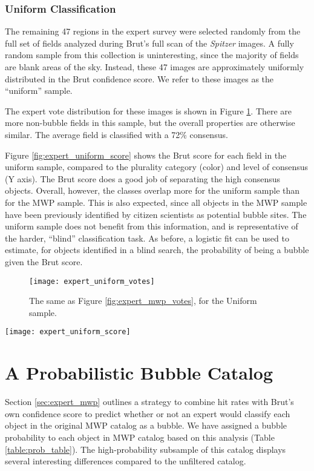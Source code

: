 \documentclass[preprint]{aastex}
\begin{document}
\subsubsection{Uniform Classification}
The remaining 47 regions in the expert survey were selected randomly from the full set of fields analyzed during Brut's full scan of the \emph{Spitzer} images. A fully random sample from this collection is uninteresting, since the majority of fields are blank areas of the sky. Instead, these 47 images are approximately uniformly distributed in the Brut confidence score. We refer to these images as the ``uniform'' sample. 

The expert vote distribution for these images is shown in Figure \ref{fig:expert_uniform_votes}. There are more non-bubble fields in this sample, but the overall properties are otherwise similar. The average field is classified with a 72\% consensus.

Figure \ref{fig:expert_uniform_score} shows the Brut score for each field in the uniform sample, compared to the plurality category (color) and level of consensus (Y axis). The Brut score does a good job of separating the high consensus objects. Overall, however, the classes overlap more for the uniform sample than for the MWP sample. This is also expected, since all objects in the MWP sample have been previously identified by citizen scientists as potential bubble sites. The uniform sample does not benefit from this information, and is representative of the harder, ``blind'' classification task. As before, a logistic fit can be used to estimate, for objects identified in a blind search, the probability of being a bubble given the Brut score.

\begin{figure}[h!]
\texttt{[image: expert\_uniform\_votes]}
\caption{The same as Figure \ref{fig:expert_mwp_votes}, for the Uniform sample.}
\label{fig:expert_uniform_votes}
\end{figure}

\begin{figure*}
\texttt{[image: expert\_uniform\_score]}
\caption{The same as Figure \ref{fig:expert_uniform_score}, for the Uniform sample.}
\label{fig:expert_uniform_score}
\end{figure*}

\section{A Probabilistic Bubble Catalog}
\label{sec:prob}
Section \ref{sec:expert_mwp} outlines a strategy to combine hit rates with Brut's own confidence score to predict whether or not
an expert would classify each object in the original MWP catalog as a bubble. We have assigned a bubble probability to each
object in MWP catalog based on this analysis (Table \ref{table:prob_table}). The high-probability subsample of this catalog displays several interesting differences compared to the unfiltered catalog. 
\end{document}
